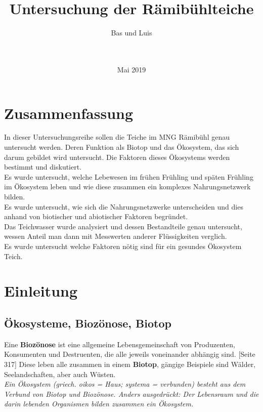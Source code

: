 \documentclass{article}
\title{\Huge{Untersuchung der Rämibühlteiche}}
\author{ \huge{Bas und Luis} \\ \\ \\
         \centering{\texttt{[image: Teichtitelbild.JPG]}}}
\date{Mai 2019}
\begin{document}
\maketitle

\newpage


\centering \section{Zusammenfassung}
In dieser Untersuchungsreihe sollen die Teiche im MNG Rämibühl genau untersucht werden. Deren Funktion als Biotop und das Ökosystem, das sich darum gebildet wird untersucht. Die Faktoren dieses Ökosystems werden bestimmt und diskutiert. \\
\vspace{5mm}
Es wurde untersucht, welche Lebewesen im frühen Frühling und späten Frühling im Ökosystem leben und wie diese zusammen ein komplexes Nahrungsnetzwerk bilden. \\
\vspace{5mm}
Es wurde untersucht, wie sich die Nahrungsnetzwerke unterscheiden und dies anhand von biotischer und abiotischer Faktoren begründet. \\
\vspace{5mm}
Das Teichwasser wurde analysiert und dessen Bestandteile genau untersucht, wessen Anteil man dann mit Messwerten anderer Flüssigkeiten verglich. \\
\vspace{5mm}
Es wurde untersucht welche Faktoren nötig sind für ein gesundes Ökosystem Teich. \\


\section{Einleitung}

    \subsection{Ökosysteme, Biozönose, Biotop}
        
        Eine \textbf{Biozönose} ist eine allgemeine Lebensgemeinschaft von Produzenten, Konsumenten und Destruenten, die alle jeweils voneinander abhängig sind. \cite{Biobuch}[Seite 317]
        Diese leben alle zusammen in einem \textbf{Biotop}, gängige Beispiele sind Wälder, Seelandschaften, aber auch Wüsten. \\
        \vspace{5mm}
        \textit{
        Ein Ökosystem (griech. oikos = Haus; systema = verbunden) besteht aus dem Verbund von Biotop und Biozönose. Anders ausgedrückt: Der Lebensraum und die darin lebenden Organismen bilden zusammen ein Ökosystem. \cite{Biologie-schule.de} } \\
        
\end{document}

